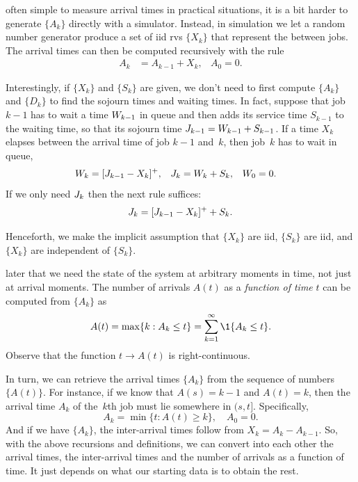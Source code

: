 \documentclass[queueing-book.tex]{subfiles}
\begin{document}
often simple to measure arrival times in practical situations, it is a bit harder to generate $\{A_{k}\}$ directly with a simulator. Instead, in simulation we let a random number generator produce a set of iid rvs $\{X_{k}\}$ that represent the  between jobs. The arrival times can then be computed recursively with the rule
\begin{align}\label{eq:qc-4}
 A_k &= A_{k-1} + X_k, &   A_{0} = 0.
 \end{align}

Interestingly, if  $\{X_{k}\}$ and $\{S_{k}\}$ are given, we don't need to first compute $\{A_{k}\}$ and $\{D_{k}\}$  to find the sojourn times and waiting  times. In fact,
suppose that job $k-1$ has to wait a time $W_{k-1}$ in queue and then adds its service time $S_{k-1}$ to the waiting time, so that its sojourn time $J_{k-1} =W_{k-1}+ S_{k-1}$. If a time $X_k$ elapses between the arrival time of job $k-1$ and~$k$, then job~$k$ has to wait in queue,
\begin{align}\label{eq:56}
 W_{k} &= [J_{k-1} -X_k]^+, & J_{k} &= W_{k} + S_{k}, & W_{0} &= 0.
\end{align}
If we only need  $J_k$ then the next rule suffices:
\begin{equation}
\label{eq:59}
J_{k} = [J_{k-1} - X_k]^+ + S_k.
\end{equation}

Henceforth, we  make the  implicit assumption  that  $\{X_k\}$ are iid,  $\{S_k\}$ are iid, and $\{X_k\}$ are independent of $\{S_k\}$.

 later that we need the state of the system at arbitrary moments in time, not just at arrival moments.
The number of arrivals $A(t)$ as a \emph{function of time} $t$ can be computed from $\{A_{k}\}$ as
\begin{equation} \label{eq:2}
 A(t) = \max\{k: A_k \leq t\} = \sum_{k=1}^{\infty}\1{A_k\leq t}.
\end{equation}
Observe that the function $t\to A(t)$ is right-continuous.

In turn, we can retrieve the arrival times $\{A_{k}\}$ from the sequence of numbers $\{A(t)\}$.
For instance, if we know that $A(s) = k-1$ and $A(t) = k$, then the arrival time $A_k$ of the~$k$th job must lie somewhere in $(s,t]$.
Specifically,
\begin{equation*}
 A_k = \min\{t: A(t) \geq k\}, \quad A_0 = 0.
\end{equation*}
And if we have $\{A_{k}\}$,  the inter-arrival times follow from $X_k = A_k - A_{k-1}$. So, with the above recursions and definitions, we can convert into each other the arrival times, the inter-arrival times and the number of arrivals as a function of time. It just depends on what our starting data is to obtain the rest.
\end{document}
